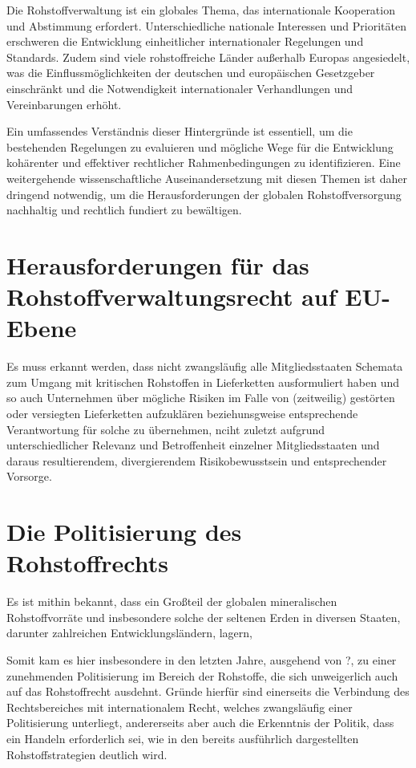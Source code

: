 \documentclass[12pt,a4paper,oneside]{book} %
\begin{document}
{	Die Rohstoffverwaltung ist ein globales Thema, das internationale Kooperation und Abstimmung erfordert. Unterschiedliche nationale Interessen und Prioritäten erschweren die Entwicklung einheitlicher internationaler Regelungen und Standards. Zudem sind viele rohstoffreiche Länder außerhalb Europas angesiedelt, was die Einflussmöglichkeiten der deutschen und europäischen Gesetzgeber einschränkt und die Notwendigkeit internationaler Verhandlungen und Vereinbarungen erhöht.
	
	Ein umfassendes Verständnis dieser Hintergründe ist essentiell, um die bestehenden Regelungen zu evaluieren und mögliche Wege für die Entwicklung kohärenter und effektiver rechtlicher Rahmenbedingungen zu identifizieren. Eine weitergehende wissenschaftliche Auseinandersetzung mit diesen Themen ist daher dringend notwendig, um die Herausforderungen der globalen Rohstoffversorgung nachhaltig und rechtlich fundiert zu bewältigen.
	
	
	
	\section{Herausforderungen für das Rohstoffverwaltungsrecht auf EU-Ebene}
	Es muss erkannt werden, dass nicht zwangsläufig alle Mitgliedsstaaten Schemata zum Umgang mit kritischen Rohstoffen in Lieferketten ausformuliert haben und so auch Unternehmen über mögliche Risiken im Falle von (zeitweilig) gestörten oder versiegten Lieferketten aufzuklären beziehunsgweise entsprechende Verantwortung für solche zu übernehmen, nciht zuletzt aufgrund unterschiedlicher Relevanz und Betroffenheit einzelner Mitgliedsstaaten und daraus resultierendem, divergierendem Risikobewusstsein und entsprechender Vorsorge.
	
	
	\section{Die Politisierung des Rohstoffrechts}
	
	Es ist mithin bekannt, dass ein Großteil der globalen mineralischen Rohstoffvorräte und insbesondere solche der seltenen Erden in diversen Staaten, darunter zahlreichen Entwicklungsländern, lagern, 
	
	Somit kam es hier insbesondere in den letzten Jahre, ausgehend von ?, zu einer zunehmenden Politisierung im Bereich der Rohstoffe, die sich unweigerlich auch auf das Rohstoffrecht ausdehnt. Gründe hierfür sind einerseits die Verbindung des Rechtsbereiches mit internationalem Recht, welches zwangsläufig einer Politisierung unterliegt, andererseits aber auch die Erkenntnis der Politik, dass ein Handeln erforderlich sei, wie in den bereits ausführlich dargestellten Rohstoffstrategien deutlich wird.
	
}
\end{document}
